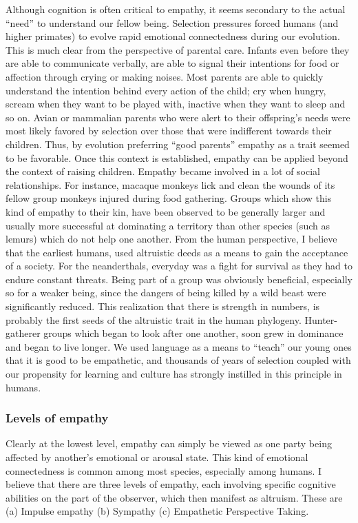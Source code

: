 \documentclass[12pt, letter]{article}
\begin{document}
Although cognition is often critical to empathy, it seems secondary to the actual ``need'' to understand our fellow being. Selection pressures forced humans (and higher primates) to evolve rapid emotional connectedness during our evolution. This is much clear from the perspective of parental care. Infants even before they are able to communicate verbally, are able to signal their intentions for food or affection through crying or making noises. Most parents are able to quickly understand the intention behind every action of the child; cry when hungry, scream when they want to be played with, inactive when they want to sleep and so on. Avian or mammalian parents who were alert to their offspring's needs were most likely favored by selection over those that were indifferent towards their children. Thus, by evolution preferring ``good parents'' empathy as a trait seemed to be favorable. Once this context is established, empathy can be applied beyond the context of raising children. Empathy became involved in a lot of social relationships. For instance, macaque monkeys lick and clean the wounds of its fellow group monkeys injured during food gathering. Groups which show this kind of empathy to their kin, have been observed to be generally larger and usually more successful at dominating a territory than other species (such as lemurs)  which do not help one another. From the human perspective, I believe that the earliest humans, used altruistic deeds as a means to gain the acceptance of a society. For the neanderthals, everyday was a fight for survival as they had to endure constant threats. Being part of a group was obviously beneficial, especially so for a weaker being, since the dangers of being killed by a wild beast were significantly reduced. This realization that there is strength in numbers, is probably the first seeds of the altruistic trait in the human phylogeny. Hunter-gatherer groups which began to look after one another, soon grew in dominance and began to live longer. We used language as a means to ``teach'' our young ones that it is good to be empathetic, and thousands of years of selection coupled with our propensity for learning and culture has strongly instilled in this principle in humans.

\subsubsection*{Levels of empathy}
Clearly at the lowest level, empathy can simply be viewed as one party being affected by another's emotional or arousal state. This kind of emotional connectedness is common among most species, especially among humans. I believe that there are three levels of empathy, each involving specific cognitive abilities on the part of the observer, which then manifest as altruism. These are (a) Impulse empathy (b) Sympathy (c) Empathetic Perspective Taking.
 
\end{document}
